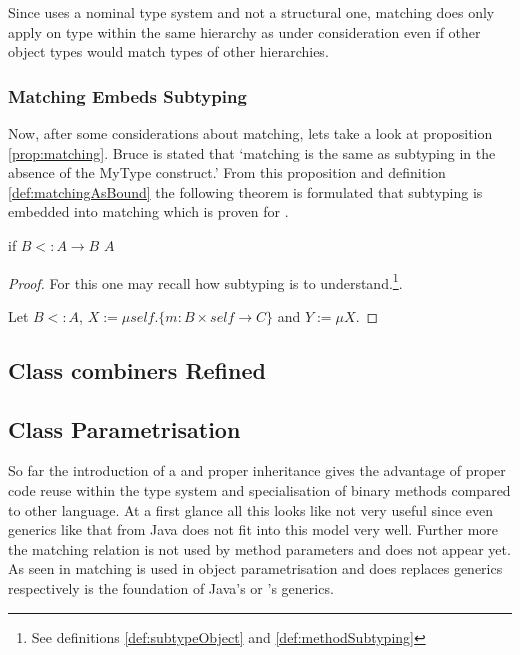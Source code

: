Since \ooplss uses a nominal type system and not a structural one,
matching does only apply on type within the same hierarchy as under
consideration even if other object types would match types of other
hierarchies.

\subsubsection{Matching Embeds Subtyping}
Now, after some considerations about matching, lets take a look at
proposition \ref{prop:matching}. Bruce is stated that `matching is
the same as subtyping in the absence of the MyType construct.' From
this proposition and definition \ref{def:matchingAsBound} the following
theorem is formulated that subtyping is embedded into matching which is
proven for \ooplss.

\begin{prop}
	\label{prop:matchinIsSubtyping}
	if $B <: A \rightarrow B$ \match $A$
\end{prop}

\begin{proof}
	For this one may recall how subtyping is to understand.\footnote{See
	definitions \ref{def:subtypeObject} and \ref{def:methodSubtyping}}.

	Let $B <: A$, $X := \mu self.\{m :
	B \times self \rightarrow C \} $ and $Y := \mu X.  $

%
\end{proof}


\subsection{Class combiners Refined}

\subsection{Class Parametrisation}
So far the introduction of a \mytype and proper inheritance gives the
advantage of proper code reuse within the type system and specialisation
of binary methods compared to other language. At a first glance all
this looks like not very useful since even generics like that from
Java does not fit into this model very well. Further more the matching
relation is not used by method parameters and does not appear yet. As
seen in  matching is used in object
parametrisation and does replaces generics respectively is the foundation
of Java's or \cs's generics. 

